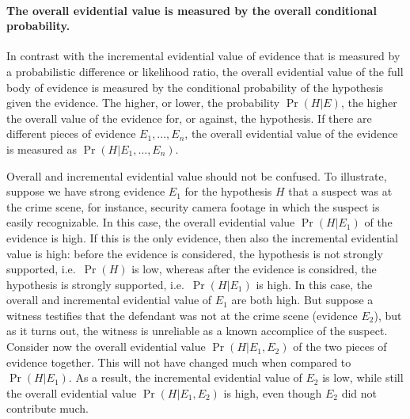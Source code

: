 \documentclass[10pt]{article}
\begin{document}


\paragraph{The overall evidential value is measured by the overall conditional probability. }

In contrast with the incremental evidential value of evidence that is measured by a probabilistic difference or likelihood ratio, the overall evidential value of the full body of evidence is measured by the conditional probability of the hypothesis given the evidence. The higher, or lower, the probability $\Pr(H|E)$, the higher 
the overall value of the evidence for, or against, the hypothesis. If there are different pieces of evidence $E_1, \ldots, E_n$, the overall evidential value of the evidence is measured as $\Pr(H|E_1, \ldots, E_n)$.

Overall and incremental evidential value should not be confused. To illustrate, suppose we have strong evidence $E_1$ for the hypothesis $H$ 
that a suspect was at the crime scene, for instance, security camera footage in which the suspect is easily recognizable. 
In this case, the overall evidential value $\Pr(H|E_1)$ of the evidence is high. If this is the only evidence, then also the 
incremental evidential value is high: before the evidence is considered, the hypothesis is not strongly supported, i.e.\ $\Pr(H)$ is low, whereas after the evidence is considred, 
the hypothesis is strongly supported, i.e.\ $\Pr(H|E_1)$ is high. In this case, the overall and incremental evidential value of $E_1$ are both high. 
But suppose a witness testifies that the defendant was not at the crime scene (evidence $E_2$), but as it turns out, the witness is unreliable 
as a known accomplice of the suspect. Consider now the overall evidential value $\Pr(H|E_1, E_2)$ of the two pieces of evidence together. This will not have changed much when compared to $\Pr(H|E_1)$. As a result, the incremental evidential value of $E_2$ is low, while still the overall evidential value $\Pr(H|E_1, E_2)$ is high, even though $E_2$ did not contribute much. 
\end{document}
